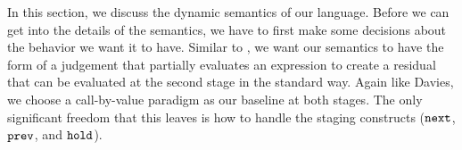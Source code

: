 %
%
%
%
%
%
%
%
%
%
%
%

In this section, we discuss the dynamic semantics of our language.  
Before we can get into the details of the semantics, we have to first make some decisions about the behavior we want it to have.  
Similar to \cite{davies96}, we want our semantics to have the form of a judgement that partially evaluates an expression to create a residual that can be evaluated at the second stage in the standard way.  Again like Davies, we choose a call-by-value paradigm as our baseline at both stages.  The only significant freedom that this leaves is how to handle the staging constructs (${\tt next}$, ${\tt prev}$, and ${\tt hold}$).  

